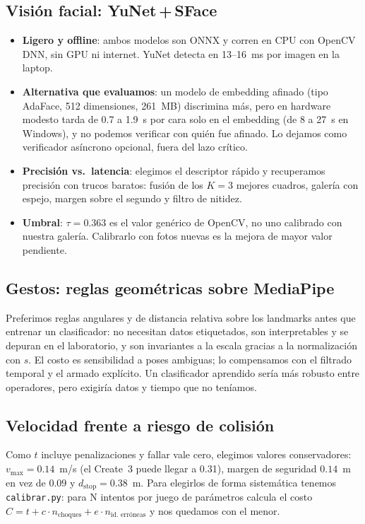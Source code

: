 \documentclass[11pt,a4paper]{article}
\newcommand{\cmd}[1]{\texttt{\small #1}}
\begin{document}
\subsection{Visi\'on facial: YuNet\,+\,SFace}
\begin{itemize}
\item \textbf{Ligero y offline}: ambos modelos son ONNX y corren en CPU con OpenCV DNN, sin GPU ni internet. YuNet detecta en 13--16~ms por imagen en la laptop.
\item \textbf{Alternativa que evaluamos}: un modelo de embedding afinado (tipo AdaFace, 512 dimensiones, 261~MB) discrimina m\'as, pero en hardware modesto tarda de 0.7 a 1.9~s por cara solo
en el embedding (de 8 a 27~s en Windows), y no podemos verificar con qui\'en fue afinado. Lo dejamos como verificador as\'incrono opcional, fuera del lazo cr\'itico.
\item \textbf{Precisi\'on vs.\ latencia}: elegimos el descriptor r\'apido y recuperamos precisi\'on con trucos baratos: fusi\'on de los $K=3$ mejores cuadros, galer\'ia con espejo, margen
sobre el segundo y filtro de nitidez.
\item \textbf{Umbral}: $\tau=0.363$ es el valor gen\'erico de OpenCV, no uno calibrado con nuestra galer\'ia. Calibrarlo con fotos nuevas es la mejora de mayor valor pendiente.
\end{itemize}

\subsection{Gestos: reglas geom\'etricas sobre MediaPipe}
Preferimos reglas angulares y de distancia relativa sobre los landmarks antes que entrenar un clasificador: no necesitan datos etiquetados, son interpretables y se depuran en el laboratorio,
y son invariantes a la escala gracias a la normalizaci\'on con $s$. El costo es sensibilidad a poses ambiguas; lo compensamos con el filtrado temporal y el armado expl\'icito. Un clasificador aprendido
ser\'ia m\'as robusto entre operadores, pero exigir\'ia datos y tiempo que no ten\'iamos.

\subsection{Velocidad frente a riesgo de colisi\'on}
Como $t$ incluye penalizaciones y fallar vale cero, elegimos valores conservadores: $v_{\max}=0.14$~m/s (el Create~3 puede llegar a 0.31), margen de seguridad $0.14$~m en vez de $0.09$ y
$d_{\text{stop}}=0.38$~m. Para elegirlos de forma sistem\'atica tenemos \cmd{calibrar.py}: para N intentos por juego de par\'ametros calcula el costo $C = t + c\cdot n_{\text{choques}} + e\cdot n_{\text{id. err\'oneas}}$ y
nos quedamos con el menor.
\end{document}
